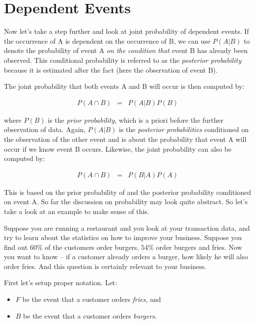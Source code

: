 \documentclass[
  letterpaper,
]{scrbook}
\begin{document}
\section{Dependent Events}\label{dependent-events}

Now let's take a step further and look at joint probability of dependent
events. If the occurrence of A is dependent on the occurrence of B, we
can use \(P(A|B)\) to denote the probability of event A \emph{on the
condition that} event B has already been observed. This conditional
probability is referred to as the \emph{posterior probability} because
it is estimated after the fact (here the observation of event B).

The joint probability that both events A and B will occur is then
computed by:

\[\begin{aligned}
P(A \cap B)
& = & P(A|B) P(B)
\end{aligned}\]

where \(P(B)\) is the \emph{prior probability}, which is a priori before
the further observation of data. Again, \(P(A|B)\) is the
\emph{posterior probabilities} conditioned on the observation of the
other event and is about the probability that event A will occur if we
know event B occurs. Likewise, the joint probability can also be
computed by:

\[\begin{aligned}
P(A \cap B)
& = & P(B|A) P(A)
\end{aligned}\]

This is based on the prior probability of and the posterior probability
conditioned on event A. So far the discussion on probability may look
quite abstract. So let's take a look at an example to make sense of
this.

Suppose you are running a restaurant and you look at your transaction
data, and try to learn about the statistics on how to improve your
business. Suppose you find out \(60\%\) of the customers order burgers,
\(54\%\) order burgers and fries. Now you want to know -- if a customer
already orders a burger, how likely he will also order fries. And this
question is certainly relevant to your business.

First let's setup proper notation. Let:

\begin{itemize}
\item
  \(F\) be the event that a customer orders \emph{fries}, and
\item
  \(B\) be the event that a customer orders \emph{burgers}.
\end{itemize}
\end{document}
